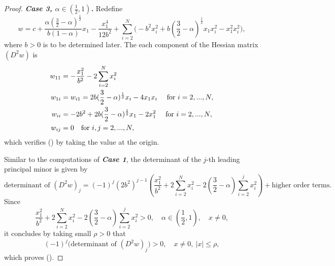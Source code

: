\documentclass[10pt,a4paper]{amsart}
\begin{document}
\begin{proof}
\noindent\textbf{\emph{Case 3, $\alpha\in(\frac{1}{2},1)$.}}     Redefine 
\[w=c+\frac{\alpha(\frac{3}{2}-\alpha)^{\frac{1}{2}}}{b(1-\alpha)}x_1-\frac{x_1^4}{12b^2}+\sum\limits_{i=2}^{N}\big(-b^2x_i^2+b(\frac{3}{2}-\alpha)^{\frac{1}{2}}x_1x_i^2-x_1^2x_i^2\big),\]
where $b>0$ is to be determined later. The each component of the Hessian matrix $(D^2w)$ is 
\begin{align}
w_{11}&=-\frac{x_1^2}{b^2}-2\sum\limits_{i=2}^{N}x_i^2\notag\\
w_{1i}&=w_{i1}=2b(\frac{3}{2}-\alpha)^{\frac{1}{2}}x_i-4x_1x_i\quad\text{ for }i=2,...,N,\notag\\
w_{ii}&=-2b^2+2b(\frac{3}{2}-\alpha)^{\frac{1}{2}}x_1-2x_1^2\quad\text{ for }i=2,...,N,\notag\\
w_{ij}&=0\quad \text{for }i,j=2,...,N,\notag
\end{align}
which verifies (\expandafter{}) by taking the value at the origin.

\vspace{2mm}

Similar to the computations of \textbf{\emph{Case 1}}, the determinant of the $j$-th leading principal minor is given by 
\[\text{determinant of } (D^2w)_j=(-1)^{j}(2b^2)^{j-1}(\frac{x_1^2}{b^2}+2\sum\limits_{i=2}^Nx_i^2-2(\frac{3}{2}-\alpha)\sum\limits_{i=2}^{j}x_i^2)+\text{higher order terms}.\]
Since 
\[\frac{x_1^2}{b^2}+2\sum\limits_{i=2}^Nx_i^2-2(\frac{3}{2}-\alpha)\sum\limits_{i=2}^{j}x_i^2>0,\quad\alpha\in (\frac{1}{2},1),\quad x\neq0,\]
it concludes by taking small $\rho>0$ that 
\[(-1)^j\big(\text{determinant of } (D^2w)_j\big)>0,\quad x\neq0,\ |x|\leq \rho,\]
which proves (\expandafter{}).

\vspace{2mm}


\end{proof}
\end{document}
